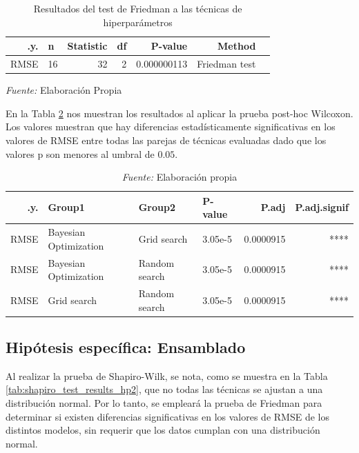 \begin{table}[h]
\caption{Resultados del test de Friedman a las técnicas de hiperparámetros}
\centering
\begin{tabular}{rlrrrrl}
\hline
.y.   & n   & Statistic & df & P-value     & Method         \\ \hline
RMSE  & 16  & 32        & 2  & 0.000000113 & Friedman test  \\ \hline
\end{tabular}
\label{tab:friedman_test_results_hp1}
\end{table}
\small\textit{Fuente:} Elaboración Propia
\vspace{5mm} 

En la Tabla \ref{tab:post_hoc_comparison_hp1} nos muestran los resultados al aplicar la prueba post-hoc Wilcoxon. Los valores muestran que hay diferencias estadísticamente significativas en los valores de RMSE entre todas las parejas de técnicas evaluadas dado que los valores p son menores al umbral de $0.05$. 

\begin{table}[h]
\caption{Resultados de la prueba post-hoc Wilcocox a las técnicas de hiperparámetros}
\label{tab:post_hoc_comparison_hp1}
\centering
\begin{tabular}{rp{4cm}p{4cm}lrr} 
\hline
.y.   & Group1                & Group2               & {P-value}   & {P.adj}     & {P.adj.signif} \\ \hline
RMSE  & Bayesian Optimization & Grid search          & 3.05e-5 & 0.0000915 & ****        \\ 
RMSE  & Bayesian Optimization & Random search        & 3.05e-5 & 0.0000915 & ****        \\ 
RMSE  & Grid search           & Random search        & 3.05e-5 & 0.0000915 & ****        \\ \hline
\end{tabular}
\caption*{\small\textit{Fuente:} Elaboración propia}
\end{table}



\subsection{Hipótesis específica: Ensamblado}
Al realizar la prueba de Shapiro-Wilk, se nota, como se muestra en la Tabla \ref{tab:shapiro_test_results_hp2}, que no todas las técnicas se ajustan a una distribución normal. Por lo tanto, se empleará la prueba de Friedman para determinar si existen diferencias significativas en los valores de RMSE de los distintos modelos, sin requerir que los datos cumplan con una distribución normal.

